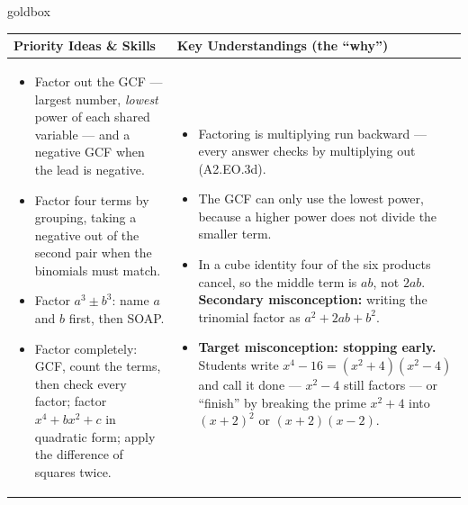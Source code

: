 \documentclass[10pt]{article}
\begin{document}
\renewcommand{\arraystretch}{1.4}
\begin{skillbox}{goldbox}
\begin{tabularx}{\linewidth}{@{}X|X@{}}
\textbf{Priority Ideas \& Skills} & \textbf{Key Understandings (the ``why'')} \\[2pt]
\hline
\vspace{-6pt}
\begin{itemize}[leftmargin=1.1em, nosep, after=\vspace{2pt}]
  \item Factor out the GCF --- largest number, \emph{lowest} power of each shared variable ---
        and a negative GCF when the lead is negative.
  \item Factor four terms by grouping, taking a negative out of the second pair when the
        binomials must match.
  \item Factor $a^3\pm b^3$: name $a$ and $b$ first, then SOAP.
  \item Factor completely: GCF, count the terms, then check every factor; factor
        $x^4+bx^2+c$ in quadratic form; apply the difference of squares twice.
\end{itemize}
&
\vspace{-6pt}
\begin{itemize}[leftmargin=1.1em, nosep, after=\vspace{2pt}]
  \item Factoring is multiplying run backward --- every answer checks by multiplying out
        (A2.EO.3d).
  \item The GCF can only use the lowest power, because a higher power does not divide the
        smaller term.
  \item In a cube identity four of the six products cancel, so the middle term is $ab$, not
        $2ab$. \textbf{Secondary misconception:} writing the trinomial factor as $a^2+2ab+b^2$.
  \item \textbf{Target misconception: stopping early.} Students write
        $x^4-16=(x^2+4)(x^2-4)$ and call it done --- $x^2-4$ still factors --- or ``finish'' by
        breaking the prime $x^2+4$ into $(x+2)^2$ or $(x+2)(x-2)$.
\end{itemize}
\end{tabularx}
\end{skillbox}
\end{document}
